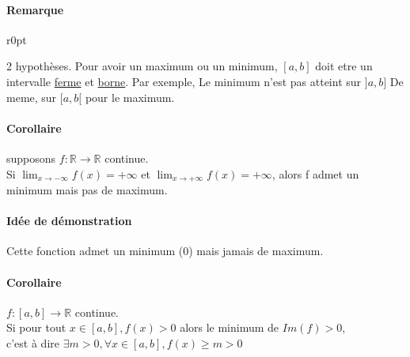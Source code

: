 \paragraph{Remarque}

\begin{wrapfigure}[5]{r}{0pt}
\end{wrapfigure}
2 hypothèses. Pour avoir un maximum ou un minimum, $[a, b]$ doit etre un intervalle \ul{ferme} et \ul{borne}. Par exemple, Le minimum n'est pas atteint sur $]a, b]$ De meme, sur $[a, b[$ pour le maximum.

		\paragraph{Corollaire} supposons $f : \mathbb{R} \rightarrow \mathbb{R}$ continue. ~\\
		Si $\lim_{x \to -\infty} f(x) = +\infty$ et $\lim_{x \to +\infty} f(x) = +\infty$, alors f admet un minimum mais pas de maximum.

		\paragraph{Idée de démonstration}

Cette fonction admet un minimum (0) mais jamais de maximum.

\paragraph{Corollaire} $f : [a, b] \rightarrow \mathbb{R}$ continue. ~\\
Si pour tout $x \in [a, b], f(x) > 0$ alors le minimum de $Im(f) > 0$,~\\
c'est à dire $\exists m > 0, \forall x \in [a, b], f(x) \geq m > 0$

